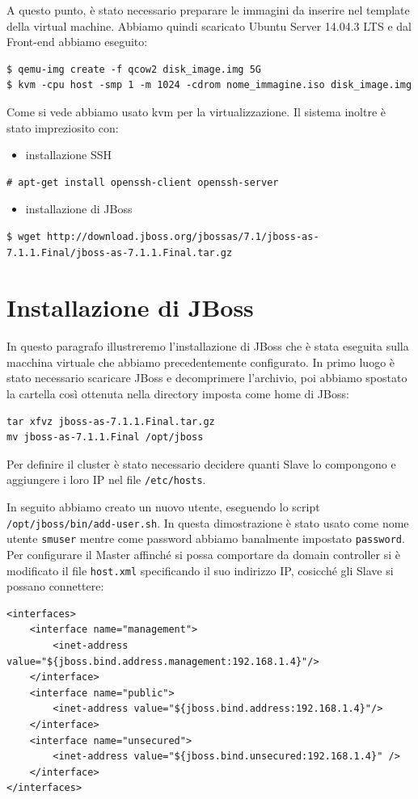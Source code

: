 \documentclass[twoside]{article}
\begin{document}
A questo punto, è stato necessario preparare le immagini da inserire nel template della virtual machine.
Abbiamo quindi scaricato Ubuntu Server 14.04.3 LTS e dal Front-end abbiamo eseguito:
\begin{lstlisting}[frame=trBL]
$ qemu-img create -f qcow2 disk_image.img 5G
$ kvm -cpu host -smp 1 -m 1024 -cdrom nome_immagine.iso disk_image.img
\end{lstlisting}
Come si vede abbiamo usato kvm \cite{bib:kvm} per la virtualizzazione.
\newpage
Il sistema inoltre è stato impreziosito con:
\begin{itemize}
	\item installazione SSH
\end{itemize}
\begin{lstlisting}[frame=trBL]
# apt-get install openssh-client openssh-server
\end{lstlisting}
\begin{itemize}
\item installazione di JBoss
\end{itemize}		  
\begin{lstlisting}[frame=trBL]
$ wget http://download.jboss.org/jbossas/7.1/jboss-as-7.1.1.Final/jboss-as-7.1.1.Final.tar.gz		  
\end{lstlisting}

\section{Installazione di JBoss}
In questo paragrafo illustreremo l'installazione di JBoss \cite{bib:jboss}
che è stata eseguita sulla macchina virtuale che abbiamo precedentemente configurato. 
In primo luogo è stato necessario scaricare JBoss e decomprimere
l'archivio, poi abbiamo spostato la cartella così ottenuta nella directory imposta come
home di JBoss:
\begin{lstlisting}[frame=trBL]
tar xfvz jboss-as-7.1.1.Final.tar.gz
mv jboss-as-7.1.1.Final /opt/jboss
\end{lstlisting}

Per definire il cluster è stato necessario decidere quanti Slave lo compongono e
aggiungere i loro IP nel file \texttt{/etc/hosts}.

In seguito abbiamo creato un nuovo utente, eseguendo lo script \texttt{/opt/jboss/bin/add-user.sh}.
In questa dimostrazione è stato usato come nome utente \texttt{smuser} mentre come password abbiamo
banalmente impostato \texttt{password}.
Per configurare il Master affinché si possa comportare da domain controller si è modificato il file
\texttt{host.xml} specificando il suo indirizzo IP, cosicché gli Slave si possano connettere:
\begin{lstlisting}[frame=trBL]
<interfaces>
	<interface name="management">
		<inet-address value="${jboss.bind.address.management:192.168.1.4}"/>
	</interface>
	<interface name="public">
		<inet-address value="${jboss.bind.address:192.168.1.4}"/>
	</interface>
	<interface name="unsecured">
		<inet-address value="${jboss.bind.unsecured:192.168.1.4}" />
	</interface>
</interfaces>
\end{lstlisting}
\end{document}
